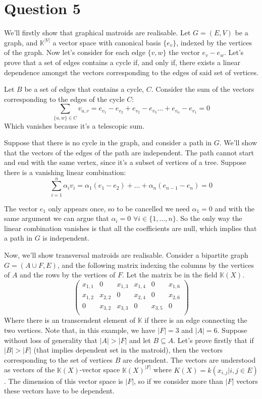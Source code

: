 \documentclass[12pt]{article}
\begin{document}
\section{Question 5}

We'll firstly show that graphical matroids are realisable. Let $G=(E,V)$ be a graph, and $\mathbb{K}^{|V|}$ a vector space with canonical basis $\{e_{v}\}$, indexed by the vertices of the graph. Now let's consider for each edge $\{v,w\}$ the vector $e_{v}-e_{w}$. Let's prove that a set of edges contains a cycle if, and only if, there exists a linear dependence amongst the vectors corresponding to the edges of said set of vertices.

Let $B$ be a set of edges that contains a cycle, $C$. Consider the sum of the vectors corresponding to the edges of the cycle $C$:
$$
\sum_{\{u,w\}\in C}v_{u,v}=e_{v_{1}}-e_{v_{2}}+e_{v_{2}}-e_{v_{3}}\ldots+e_{v_{n}}-e_{v_{1}}=0
$$
Which vanishes because it's a telescopic sum.

Suppose that there is no cycle in the graph, and consider a path in $G$. We'll show that the vectors of the edges of the path are independent. The path cannot start and end with the same vertex, since it's a subset of vertices of a tree. Suppose there is a vanishing linear combination:
$$
\sum_{i=1}^{n}\alpha_{i}v_{i}=\alpha_{1}(e_{1}-e_{2})+\ldots+\alpha_{n}(e_{n-1}-e_{n})=0
$$

The vector $e_{1}$ only appears once, so to be cancelled we need $\alpha_{1}=0$ and with the same argument we can argue that $\alpha_{i}=0$ $\forall i\in\{1,\ldots,n\}$. So the only way the linear combination vanishes is that all the coefficients are null, which implies that a path in $G$ is independent.

Now, we'll show transversal matroids are realisable. Consider a bipartite graph $G=(A\cup F,E)$, and the following matrix indexing the columns by the vertices of $A$ and the rows by the vertices of $F$. Let the matrix be in the field $\mathbb{K}(X)$.
$$
\begin{pmatrix}
x_{1,1} & 0 & x_{1,3} & x_{1,4} & 0 & x_{1,6}\\
 x_{1,2} & x_{2,2} & 0 & x_{2,4} & 0 & x_{2,6}\\
 0 & x_{3,2} & x_{3,3} & 0 & x_{3,5} & 0\\
\end{pmatrix}
$$
Where there is an transcendent element of $\mathbb{K}$ if there is an edge connecting the two vertices. Note that, in this example, we have $|F|=3$ and $|A|=6$. Suppose without loss of generality that $|A|>|F|$ and let $B \subseteq A$. Let's prove firstly that if $|B|>|F|$ (that implies dependent set in the matroid), then the vectors corresponding to the set of vertices $B$ are dependent. The vectors are understood as vectors of the $\mathbb{K}(X)$-vector space $\mathbb{K}(X)^{|F|}$ where $K(X)=k(x_{i,j}|{i,j}\in E)$. The dimension of this vector space is $|F|$, so if we consider more than $|F|$ vectors these vectors have to be dependent.
\end{document}
